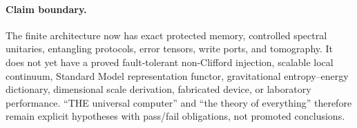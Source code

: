 \paragraph{Claim boundary.}
The finite architecture now has exact protected memory, controlled spectral
unitaries, entangling protocols, error tensors, write ports, and tomography.
It does not yet have a proved fault-tolerant non-Clifford injection, scalable
local continuum, Standard Model representation functor, gravitational
entropy--energy dictionary, dimensional scale derivation, fabricated device,
or laboratory performance.  ``THE universal computer'' and ``the theory of
everything'' therefore remain explicit hypotheses with pass/fail obligations,
not promoted conclusions.
